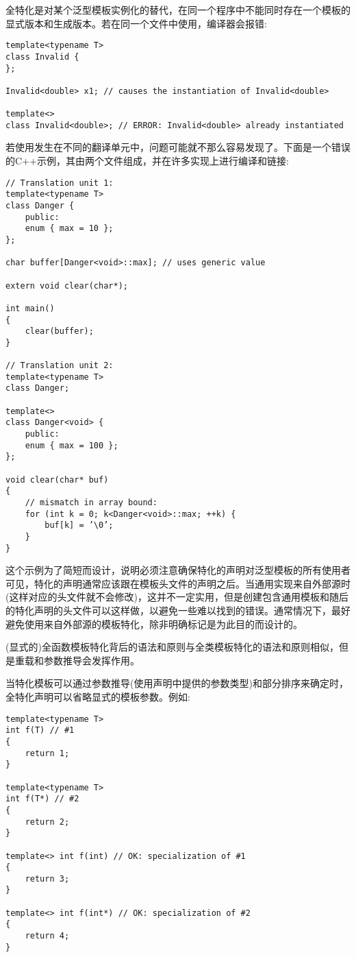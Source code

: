 全特化是对某个泛型模板实例化的替代，在同一个程序中不能同时存在一个模板的显式版本和生成版本。若在同一个文件中使用，编译器会报错:

\begin{lstlisting}[style=styleCXX]
template<typename T>
class Invalid {
};

Invalid<double> x1; // causes the instantiation of Invalid<double>

template<>
class Invalid<double>; // ERROR: Invalid<double> already instantiated
\end{lstlisting}

若使用发生在不同的翻译单元中，问题可能就不那么容易发现了。下面是一个错误的C++示例，其由两个文件组成，并在许多实现上进行编译和链接:

\begin{lstlisting}[style=styleCXX]
// Translation unit 1:
template<typename T>
class Danger {
	public:
	enum { max = 10 };
};

char buffer[Danger<void>::max]; // uses generic value

extern void clear(char*);

int main()
{
	clear(buffer);
}

// Translation unit 2:
template<typename T>
class Danger;

template<>
class Danger<void> {
	public:
	enum { max = 100 };
};

void clear(char* buf)
{
	// mismatch in array bound:
	for (int k = 0; k<Danger<void>::max; ++k) {
		buf[k] = ’\0’;
	}
}
\end{lstlisting}

这个示例为了简短而设计，说明必须注意确保特化的声明对泛型模板的所有使用者可见，特化的声明通常应该跟在模板头文件的声明之后。当通用实现来自外部源时(这样对应的头文件就不会修改)，这并不一定实用，但是创建包含通用模板和随后的特化声明的头文件可以这样做，以避免一些难以找到的错误。通常情况下，最好避免使用来自外部源的模板特化，除非明确标记是为此目的而设计的。


(显式的)全函数模板特化背后的语法和原则与全类模板特化的语法和原则相似，但是重载和参数推导会发挥作用。

当特化模板可以通过参数推导(使用声明中提供的参数类型)和部分排序来确定时，全特化声明可以省略显式的模板参数。例如:

\begin{lstlisting}[style=styleCXX]
template<typename T>
int f(T) // #1
{
	return 1;
}

template<typename T>
int f(T*) // #2
{
	return 2;
}

template<> int f(int) // OK: specialization of #1
{
	return 3;
}

template<> int f(int*) // OK: specialization of #2
{
	return 4;
}
\end{lstlisting}


